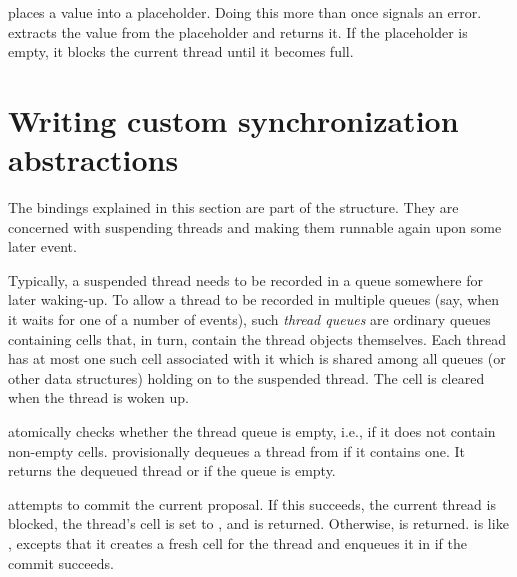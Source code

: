  places a value into a placeholder.  Doing this
more than once signals an error.   extracts
the value from the placeholder and returns it.  If the placeholder is
empty, it blocks the current thread until it becomes full.



\section{Writing custom synchronization abstractions}

The bindings explained in this section are part of the
 structure.  They are concerned with suspending
threads and making them runnable again upon some later event.

Typically, a suspended thread needs to be recorded in a queue
somewhere for later waking-up.  To allow a thread to be recorded in
multiple queues (say, when it waits for one of a number of events),
such \textit{thread queues} are ordinary queues containing cells that,
in turn, contain the thread objects themselves.  Each thread has at
most one such cell associated with it which is shared among all queues
(or other data structures) holding on to the suspended thread.  The
cell is cleared when the thread is woken up.
%
\begin{protos}
\end{protos}
%
 atomically checks whether the
 thread queue is empty, i.e., if it does not
contain non-empty cells.   provisionally
dequeues a thread from  if it contains one.  It
returns the dequeued thread or  if the queue is empty.
%
\begin{protos}
\end{protos}
%
 attempts to commit the current proposal.
If this succeeds, the current thread is blocked, the thread's cell is
set to , and  is returned.  Otherwise, 
is returned.   is like
, excepts that it creates a fresh cell
for the thread and enqueues it in  if the commit
succeeds.

